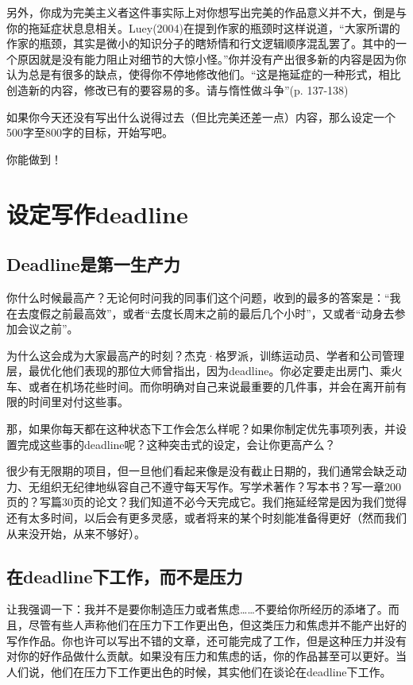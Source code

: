 \documentclass{ctexart}
\begin{document}
另外，你成为完美主义者这件事实际上对你想写出完美的作品意义并不大，倒是与你的拖延症状息息相关。Luey(2004)在提到作家的瓶颈时这样说道，“大家所谓的作家的瓶颈，其实是微小的知识分子的瞎矫情和行文逻辑顺序混乱罢了。其中的一个原因就是没有能力阻止对细节的大惊小怪。”你并没有产出很多新的内容是因为你认为总是有很多的缺点，使得你不停地修改他们。“这是拖延症的一种形式，相比创造新的内容，修改已有的要容易的多。请与惰性做斗争”(p. 137-138)

如果你今天还没有写出什么说得过去（但比完美还差一点）内容，那么设定一个500字至800字的目标，开始写吧。

你能做到！

\section{​设定写作deadline}
\subsection{Deadline是第一生产力}

你什么时候最高产？无论何时问我的同事们这个问题，收到的最多的答案是：“我在去度假之前最高效”，或者“去度长周末之前的最后几个小时”，又或者“动身去参加会议之前”。

为什么这会成为大家最高产的时刻？杰克·格罗派，训练运动员、学者和公司管理层，最优化他们表现的那位大师曾指出，因为deadline。你必定要走出房门、乘火车、或者在机场花些时间。而你明确对自己来说最重要的几件事，并会在离开前有限的时间里对付这些事。

那，如果你每天都在这种状态下工作会怎么样呢？如果你制定优先事项列表，并设置完成这些事的deadline呢？这种突击式的设定，会让你更高产么？

很少有无限期的项目，但一旦他们看起来像是没有截止日期的，我们通常会缺乏动力、无组织无纪律地纵容自己不遵守每天写作。写学术著作？写本书？写一章200页的？写篇30页的论文？我们知道不必今天完成它。我们拖延经常是因为我们觉得还有太多时间，以后会有更多灵感，或者将来的某个时刻能准备得更好（然而我们从来没开始，从来不够好）。

\subsection{在deadline下工作，而不是压力}

让我强调一下：我并不是要你制造压力或者焦虑……不要给你所经历的添堵了。而且，尽管有些人声称他们在压力下工作更出色，但这类压力和焦虑并不能产出好的写作作品。你也许可以写出不错的文章，还可能完成了工作，但是这种压力并没有对你的好作品做什么贡献。如果没有压力和焦虑的话，你的作品甚至可以更好。当人们说，他们在压力下工作更出色的时候，其实他们在谈论在deadline下工作。
\end{document}
